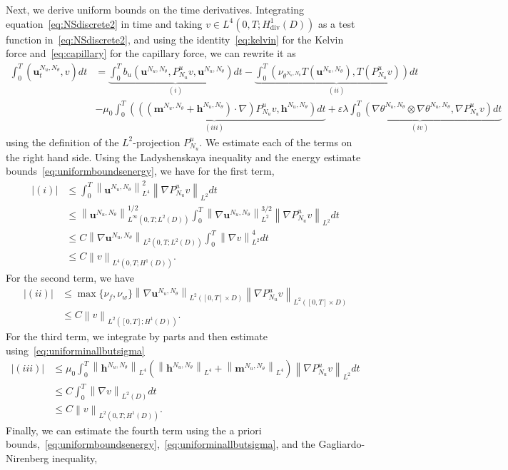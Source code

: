 \documentclass[10pt,letterpaper,twoside]{amsart}
\theoremstyle{definition}{\newtheorem{definition}[lemma]{Definition}}
\theoremstyle{note}{\newtheorem{claim}{Claim}[section]
\newtheorem*{claim*}{Claim}}
\numberwithin{equation}{section}
\newcommand{\dom}{D}
\newcommand{\norm}[1]{\left\| #1 \right\|}
\newcommand{\eps}{\varepsilon}
\newcommand{\Grad}{\nabla}
\newcommand{\Div}{\operatorname{div}}
\newcommand{\V}{H^1_{\Div}(\dom)}
\newcommand{\bmb}{\mathbf{m}^{N_u,N_\theta}}
\newcommand{\bhb}{\mathbf{h}^{N_u,N_\theta}}
\newcommand{\bub}{\mathbf{u}^{N_u,N_\theta}}
\newcommand{\thb}{\theta^{N_u,N_\theta}}
\begin{document}
Next, we derive uniform bounds on the time derivatives.  Integrating equation~\eqref{eq:NSdiscrete2} in time and taking $v\in L^4(0,T;\V)$ as a test function in~\eqref{eq:NSdiscrete2}, and using the identity~\eqref{eq:kelvin} for the Kelvin force and~\eqref{eq:capillary} for the capillary force, we can rewrite it as
\begin{align*}
		\int_0^T(\bub_t,v)dt &=\underbrace{\int_0^Tb_u(\bub,P^u_{N_u}v,\bub)dt}_{(i)} -\underbrace{\int_0^T(\nu_{\thb} T(\bub),T( P^u_{N_u}v)) dt}_{(ii)}\\
		& -\underbrace{\mu_0\int_0^T(((\bmb+\bhb)\cdot\Grad)P^u_{N_u}v,\bhb)dt}_{(iii)} +\underbrace{\eps\lambda\int_0^T(\Grad\thb\otimes\Grad\thb,\Grad P^u_{N_u}v)dt}_{(iv)} 
\end{align*}
using the definition of the $L^2$-projection $P^u_{N_u}$. We estimate each of the terms on the right hand side. Using the Ladyshenskaya inequality and the energy estimate bounds~\eqref{eq:uniformboundsenergy}, we have for the first term,
\begin{align*}
	|(i)|& \leq \int_0^T\norm{\bub}_{L^4}^2\norm{\Grad P^u_{N_u} v}_{L^2} dt \\
	& \leq \norm{\bub}_{L^\infty(0,T;L^2(\dom))}^{1/2}\int_0^T\norm{\Grad\bub}_{L^2}^{3/2}\norm{\Grad P^u_{N_u} v}_{L^2} dt \\
	& \leq C \norm{\Grad \bub}_{L^2(0,T;L^2(\dom))}\int_0^T \norm{\Grad v}_{L^2}^4 dt\\
	& \leq C \norm{v}_{L^4(0,T;H^1(\dom))}.
\end{align*}
For the second term, we have
\begin{align*}
	|(ii)|& \leq \max\{\nu_f,\nu_w\}\norm{\Grad\bub}_{L^2([0,T]\times\dom)}\norm{\Grad P^u_{N_u} v}_{L^2([0,T]\times\dom)}\\
	& \leq C \norm{v}_{L^2([0,T];H^1(\dom))}.
\end{align*}
 For the third term, we integrate by parts and then estimate using~\eqref{eq:uniforminallbutsigma}
 \begin{align*}
 	|(iii)|&\leq \mu_0 \int_0^T\norm{\bhb}_{L^4}\left(\norm{\bhb}_{L^4}+\norm{\bmb}_{L^4}\right)\norm{\Grad P^u_{N_u} v}_{L^2}dt \\
 	& \leq C \int_0^T \norm{\Grad v}_{L^2(\dom)} dt\\
 	& \leq C \norm{v}_{L^2(0,T;H^1(\dom))}.
 \end{align*}
 Finally, we can estimate the fourth term using the a priori bounds,~\eqref{eq:uniformboundsenergy},~\eqref{eq:uniforminallbutsigma}, and the Gagliardo-Nirenberg inequality,
\end{document}
